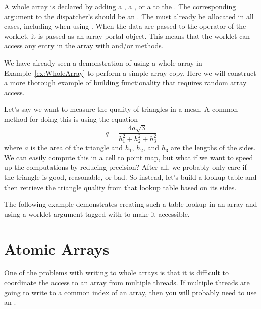 A whole array is declared by adding a , a , or a  to the \controlsignature.
The corresponding argument to the dispatcher's  should be an .
The  must already be allocated in all cases, including when using .
When the data are passed to the operator of the worklet, it is passed as an array portal object.
This means that the worklet can access any entry in the array with  and/or  methods.

We have already seen a demonstration of using a whole array in
Example~\ref{ex:WholeArray} to perform a simple array copy. Here we will
construct a more thorough example of building functionality that requires
random array access.

Let's say we want to measure the quality of triangles in a mesh. A
common method for doing this is using the equation
\begin{equation*}
  q = \frac{4a\sqrt{3}}{h_1^2 + h_2^2 + h_3^2}
\end{equation*}
where $a$ is the area of the triangle and $h_1$, $h_2$, and $h_3$ are the
lengths of the sides. We can easily compute this in a cell to point map,
but what if we want to speed up the computations by reducing precision?
After all, we probably only care if the triangle is good, reasonable, or
bad. So instead, let's build a lookup table and then retrieve the triangle
quality from that lookup table based on its sides.

The following example demonstrates creating such a table lookup in an array
and using a worklet argument tagged with  to make it
accessible.




\section{Atomic Arrays}
\label{sec:AtomicArrays}


One of the problems with writing to whole arrays is that it is difficult to coordinate the access to an array from multiple threads.
If multiple threads are going to write to a common index of an array, then you will probably need to use an .

